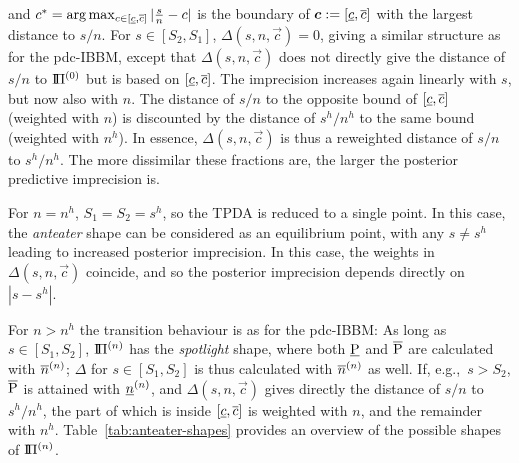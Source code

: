 and $c^* =  \arg\max_{c \in [\underline{c}, \overline{c}]} |\frac{s}{n} - c|$ is the boundary of ${\bm c} := [\underline{c}, \overline{c}]$ with the largest distance to $s/n$.
For $s \in [S_2, S_1]$, $\Delta(s, n, \vec{c}) = 0$,
giving a similar structure as for the pdc-IBBM, except that
$\Delta(s, n,\vec{c})$ does not directly give the distance of $s/n$ to $\text{I}\!\Pi^{(0)}$ but is based on $[\underline{c}, \overline{c}]$.
The imprecision increases again linearly with $s$,
but now also with $n$. The distance of $s/n$ to the opposite bound of $[\underline{c}, \overline{c}]$
(weighted with $n$) is discounted by the distance of $s^h/n^h$ to the same bound
(weighted with $n^h$). In essence, $\Delta(s, n, \vec{c})$ is thus a reweighted distance of $s/n$ to $s^h/n^h$.
The more dissimilar these fractions are, the larger the posterior predictive imprecision is.


For $n = n^h$, $S_1 = S_2 = s^h$, so the TPDA is reduced to a single point. In this case, the \emph{anteater}
shape can be considered as an equilibrium point,
with any $s \neq s^h$ leading to increased posterior imprecision.
In this case, the weights in $\Delta(s, n, \vec{c})$ coincide, and so
the posterior imprecision depends directly on $|s-s^h|$.

For $n > n^h$ the transition behaviour is as for the pdc-IBBM:
As long as $s \in [S_1, S_2]$, $\text{I}\!\Pi^{(n)}$ has the \emph{spotlight} shape,
where both $\underline{\operatorname{P}}$ and $\overline{\operatorname{P}}$ are calculated with $\overline{n}^{(n)}$; $\Delta$ for $s \in [S_1, S_2]$ is
thus calculated with $\overline{n}^{(n)}$ as well.
If, e.g.,\ $s > S_2$, $\overline{\operatorname{P}}$ is attained with $\underline{n}^{(n)}$, and $\Delta(s, n, \vec{c})$
gives directly the distance of $s/n$ to $s^h/n^h$, the part of which is
inside $[\underline{c}, \overline{c}]$ is weighted with $n$, and the remainder with $n^h$.
Table~\ref{tab:anteater-shapes} provides an overview of the possible shapes of $\text{I}\!\Pi^{(n)}$.

